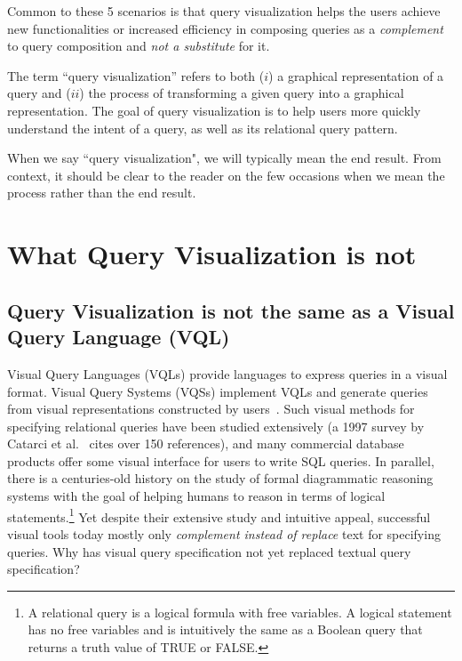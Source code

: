\documentclass[letterpaper,11pt]{article}
\begin{document}




Common to these 5 scenarios is that query visualization helps the users achieve new functionalities 
or increased efficiency in composing queries
as a \emph{complement} to query composition and 
\emph{not a substitute} for it.
%
%
%


\begin{definition}
The term ``query visualization'' refers to both ($i$) a graphical representation of a query 
and ($ii$) the process of transforming a given query into a graphical representation.
The goal of query visualization is to help users more quickly understand the intent of a query,
as well as its relational query pattern.
\end{definition}

When we say ``query visualization", we will typically mean the end result. 
From context, it should be clear to the reader on the few occasions when we mean the process rather than the end result.













\section{What Query Visualization is not}
\label{section:whatisQVnot}


\subsection{Query Visualization is not the same as a Visual Query Language (VQL)}
\label{QVisnotVQL}

Visual Query Languages (VQLs) provide languages to express queries in a visual format.
Visual Query Systems (VQSs) implement VQLs and generate queries from visual representations constructed by users~\cite{DBLP:reference/db/Catarci18a}.
Such visual methods for specifying relational queries have been studied
extensively
(a 1997 survey by Catarci et al.~\cite{DBLP:journals/vlc/CatarciCLB97} 
cites over 150 references), and
many commercial database products offer some visual interface for users to write SQL queries.  
In parallel, there is a centuries-old history on the study of formal diagrammatic reasoning systems \cite{DBLP:conf/iccs/Howse08}
with the goal of helping humans to reason in terms of logical statements.\footnote{A relational query is a logical formula with free variables. 
A logical statement has no free variables and is intuitively the same as a Boolean query that returns a truth value of TRUE or FALSE. }
Yet despite their extensive study and intuitive appeal, successful visual tools today mostly only 
\emph{complement instead of 
replace}
%
text for specifying queries.
Why has visual query specification not yet replaced textual query specification?
\end{document}
